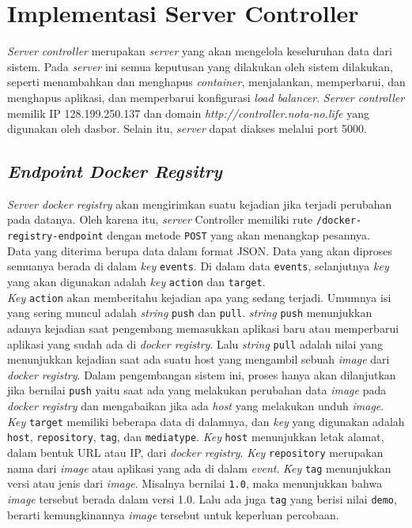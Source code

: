     \section{Implementasi Server Controller}
    	\textit{Server} \textit{controller} merupakan \textit{server} yang akan mengelola keseluruhan data dari sistem. Pada \textit{server} ini semua keputusan yang dilakukan oleh sistem dilakukan, seperti menambahkan dan menghapus \textit{container}, menjalankan, memperbarui, dan menghapus aplikasi, dan memperbarui konfigurasi \textit{load balancer}. \textit{Server controller} memilik IP 128.199.250.137 dan domain \textit{http://controller.nota-no.life} yang digunakan oleh dasbor. Selain itu, \textit{server} dapat diakses melalui port 5000.
    	\subsection{\textit{Endpoint Docker Regsitry}}
        	\textit{Server docker registry} akan mengirimkan suatu kejadian jika terjadi perubahan pada datanya. Oleh karena itu, \textit{server} Controller memiliki rute \texttt{/docker-registry-endpoint} dengan metode \texttt{POST} yang akan menangkap pesannya.\\
            \indent Data yang diterima berupa data dalam format JSON. Data yang akan diproses semuanya berada di dalam \textit{key} \texttt{events}. Di dalam data \texttt{events}, selanjutnya \textit{key} yang akan digunakan adalah \textit{key} \texttt{action} dan \texttt{target}. \\
            \indent \textit{Key} \texttt{action} akan memberitahu kejadian apa yang sedang terjadi. Umumnya isi yang sering muncul adalah \textit{string} \texttt{push} dan \texttt{pull}. \textit{string} \texttt{push} menunjukkan adanya kejadian saat pengembang memasukkan aplikasi baru atau memperbarui aplikasi yang sudah ada di \textit{docker registry}. Lalu \textit{string} \texttt{pull} adalah nilai yang menunjukkan kejadian saat ada suatu host yang mengambil sebuah \textit{image} dari \textit{docker registry}. Dalam pengembangan sistem ini, proses hanya akan dilanjutkan jika bernilai \texttt{push} yaitu saat ada yang melakukan perubahan data \textit{image} pada \textit{docker registry} dan mengabaikan jika ada \textit{host} yang melakukan unduh \textit{image}.\\
            \indent \textit{Key} \texttt{target} memiliki beberapa data di dalamnya, dan \textit{key} yang digunakan adalah \texttt{host}, \texttt{repository}, \texttt{tag}, dan  \texttt{mediatype}. \textit{Key} \texttt{host} menunjukkan letak alamat, dalam bentuk URL atau IP, dari \textit{docker registry}. \textit{Key} \texttt{repository} merupakan nama dari \textit{image} atau aplikasi yang ada di dalam \textit{event}. \textit{Key} \texttt{tag} menunjukkan versi atau jenis dari \textit{image}. Misalnya bernilai \texttt{1.0}, maka menunjukkan bahwa \textit{image} tersebut berada dalam versi 1.0. Lalu ada juga \texttt{tag} yang berisi nilai \texttt{demo}, berarti kemungkinannya \textit{image} tersebut untuk keperluan percobaan.\\
